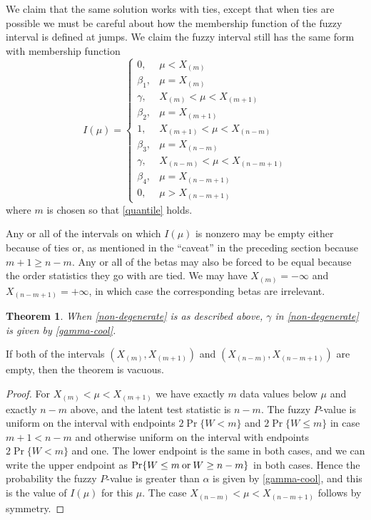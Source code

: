 \documentclass{article}
\newcommand{\opor}{\mathbin{\rm or}}
\newtheorem{theorem}{Theorem}
\begin{document}
We claim that the same solution works with ties, except that when ties
are possible
we must be careful about how the membership function of the fuzzy interval
is defined at jumps.  We claim the fuzzy interval still has the same form
with membership function
\begin{equation} \label{non-degenerate}
   I(\mu)
   =
   \begin{cases}
   0, & \mu < X_{(m)}
   \\
   \beta_1, & \mu = X_{(m)}
   \\
   \gamma, & X_{(m)} < \mu < X_{(m + 1)}
   \\
   \beta_2, & \mu = X_{(m + 1)}
   \\
   1, & X_{(m + 1)} < \mu < X_{(n - m)}
   \\
   \beta_3, & \mu = X_{(n - m)}
   \\
   \gamma, & X_{(n - m)} < \mu < X_{(n - m + 1)}
   \\
   \beta_4, & \mu = X_{(n - m + 1)}
   \\
   0, & \mu > X_{(n - m + 1)}
   \end{cases}
\end{equation}
where $m$ is chosen so that \eqref{quantile} holds.

Any or all of the intervals on which $I(\mu)$ is nonzero may be empty
either because of ties or, as mentioned in the ``caveat'' in the
preceding section because $m + 1 \ge n - m$.
Any or all of the betas may also be forced to be equal because the
order statistics they go with are tied.
We may have $X_{(m)} = - \infty$ and $X_{(n - m + 1)} = + \infty$,
in which case the corresponding betas are irrelevant.

\begin{theorem} \label{th:gamma}
When \eqref{non-degenerate} is as described above,
$\gamma$ in \eqref{non-degenerate} is given by \eqref{gamma-cool}.
\end{theorem}
If both of the intervals $(X_{(m)}, X_{(m + 1)})$ and
$(X_{(n - m)}, X_{(n - m + 1)})$ are empty, then the theorem is vacuous.
\begin{proof}
For $X_{(m)} < \mu < X_{(m + 1)}$
we have exactly $m$ data values below $\mu$ and exactly $n - m$ above,
and the latent test statistic is $n - m$.  The fuzzy $P$-value is uniform
on the interval with endpoints $2 \Pr\{ W < m \}$ and $2 \Pr \{ W \le m \}$
in case $m + 1 < n - m$ and otherwise uniform on the interval with
endpoints $2 \Pr\{ W < m \}$ and one.
The lower endpoint is the same in both cases, and we can write the upper
endpoint as $\Pr\{ W \le m \opor W \ge n - m \}$ in both cases.
Hence the probability the fuzzy $P$-value is greater than $\alpha$ is
given by \eqref{gamma-cool}, and this is the value of $I(\mu)$ for this
$\mu$.
The case $X_{(n - m)} < \mu < X_{(n - m + 1)}$ follows by symmetry.
\end{proof}
\end{document}
